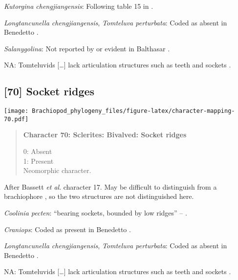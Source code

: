 \documentclass[openany]{book}
\theoremstyle{definition}
\theoremstyle{definition}
\theoremstyle{definition}
\theoremstyle{remark}
\begin{document}
\hypertarget{Kutorgina_chengjiangensis-coding-69}{}
\emph{Kutorgina chengjiangensis}: Following table 15 in
\citet{Williams2000LinguliformeaCraniiformea}.

\hypertarget{Longtancunella_chengjiangensis-coding-69}{}
\emph{Longtancunella chengjiangensis}, \emph{Tomteluva perturbata}:
Coded as absent in Benedetto \citeyearpar{Benedetto2009iChaniella}.

\hypertarget{Salanygolina-coding-69}{}
\emph{Salanygolina}: Not reported by or evident in Balthasar
\citeyearpar{Balthasar2004Shellstructure}.

\hypertarget{NA-coding-69}{}
NA: Tomteluvids {[}\ldots{}{]} lack articulation structures such as
teeth and sockets \citep{Streng2016Anew}.

\subsection*{{[}70{]} Socket ridges}\label{socket-ridges}

\texttt{[image: Brachiopod\_phylogeny\_files/figure-latex/character-mapping-70.pdf]}

\begin{quote}
\textbf{Character 70: Sclerites: Bivalved: Socket ridges}

0: Absent\\
1: Present\\
Neomorphic character.
\end{quote}

After Bassett \emph{et al}.
\citeyearpar{Bassett2001Functionalmorphology} character 17. May be
difficult to distinguish from a brachiophore \citep[see Fig 323
in][]{Williams1997Introduction}, so the two structures are not
distinguished here.

\hypertarget{Coolinia_pecten-coding-70}{}
\emph{Coolinia pecten}: ``bearing sockets, bounded by low ridges'' --
\citet{Williams2000LinguliformeaCraniiformea}.

\hypertarget{Craniops-coding-70}{}
\emph{Craniops}: Coded as present in Benedetto
\citeyearpar{Benedetto2009iChaniella}.

\hypertarget{Longtancunella_chengjiangensis-coding-70}{}
\emph{Longtancunella chengjiangensis}, \emph{Tomteluva perturbata}:
Coded as absent in Benedetto \citeyearpar{Benedetto2009iChaniella}.

\hypertarget{NA-coding-70}{}
NA: Tomteluvids {[}\ldots{}{]} lack articulation structures such as
teeth and sockets \citep{Streng2016Anew}.
\end{document}
